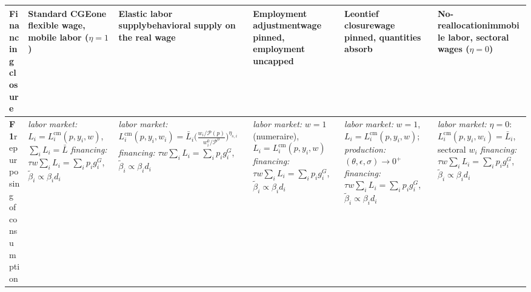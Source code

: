 \begin{table}[htbp]
\centering
\footnotesize
\setlength{\tabcolsep}{2pt}
\renewcommand{\arraystretch}{1.4}
\begin{tabular}{@{}>{\raggedright\arraybackslash}p{1.85cm}
                  >{\raggedright\arraybackslash}p{2.45cm}
                  >{\raggedright\arraybackslash}p{2.45cm}
                  >{\raggedright\arraybackslash}p{2.45cm}
                  >{\raggedright\arraybackslash}p{2.45cm}
                  >{\raggedright\arraybackslash}p{2.45cm}@{}}
\toprule
\textbf{Financing closure}
& \textbf{Standard CGE}\newline \scriptsize one flexible wage, mobile labor ($\eta = 1$)
& \textbf{Elastic labor supply}\newline \scriptsize behavioral supply on the real wage
& \textbf{Employment adjustment}\newline \scriptsize wage pinned, employment uncapped
& \textbf{Leontief closure}\newline \scriptsize wage pinned, quantities absorb
& \textbf{No-reallocation}\newline \scriptsize immobile labor, sectoral wages ($\eta = 0$) \\
\midrule

\textbf{F1}\newline \scriptsize repurposing of consumption
& \textit{labor market:} $L_i = L_i^{\mathrm{cm}}(p, y_i, w)$, $\sum_i L_i = \bar L$
  \newline \textit{financing:} $\tau w \sum_i L_i = \sum_i p_i g^{G}_i$, $\tilde\beta_i \propto \beta_i d_i$
& \textit{labor market:} $L_i^{\mathrm{cm}}(p, y_i, w_i) = \bar L_i \allowbreak \bigl(\tfrac{w_i/\mathcal{P}(p)}{w_i^{0}/\mathcal{P}^{0}}\bigr)^{\eta_{s,i}}$
  \newline \textit{financing:} $\tau w \sum_i L_i = \sum_i p_i g^{G}_i$, $\tilde\beta_i \propto \beta_i d_i$
& \textit{labor market:} $w = 1$ (numeraire), $L_i = L_i^{\mathrm{cm}}(p, y_i, w)$
  \newline \textit{financing:} $\tau w \sum_i L_i = \sum_i p_i g^{G}_i$, $\tilde\beta_i \propto \beta_i d_i$
& \textit{labor market:} $w = 1$, $L_i = L_i^{\mathrm{cm}}(p, y_i, w)$; \textit{production:} $(\theta, \epsilon, \sigma) \to 0^{+}$
  \newline \textit{financing:} $\tau w \sum_i L_i = \sum_i p_i g^{G}_i$, $\tilde\beta_i \propto \beta_i d_i$
& \textit{labor market:} $\eta = 0$: $L_i^{\mathrm{cm}}(p, y_i, w_i) = \bar L_i$, sectoral $w_i$
  \newline \textit{financing:} $\tau w \sum_i L_i = \sum_i p_i g^{G}_i$, $\tilde\beta_i \propto \beta_i d_i$ \\
\midrule


\end{tabular}
\end{table}
